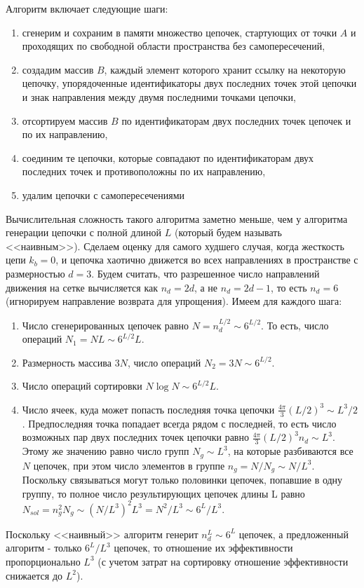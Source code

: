 \documentclass[tikz,a4paper]{scrartcl} %
\begin{document}
Алгоритм включает следующие шаги:
\begin{enumerate}
\item сгенерим и сохраним в памяти множество цепочек, стартующих от точки $A$ и проходящих по свободной области пространства без самопересечений,
\item создадим массив $B$, каждый элемент которого хранит ссылку на некоторую цепочку, упорядоченные идентификаторы двух последних точек этой цепочки и знак направления между двумя последними точками цепочки,
\item отсортируем массив $B$ по идентификаторам двух последних точек цепочек и по их направлению,
\item соединим те цепочки, которые совпадают по идентификаторам двух последних точек и противоположны по их направлению,
\item удалим цепочки с самопересечениями
\end{enumerate}

Вычислительная сложность такого алгоритма заметно меньше, чем у алгоритма генерации цепочки с полной длиной $L$ (который будем называть <<наивным>>). Сделаем оценку для самого худшего случая, когда жесткость цепи $k_b=0$, и цепочка хаотично движется во всех направлениях в пространстве с размерностью $d=3$. Будем считать, что разрешенное число направлений движения на сетке вычисляется как $n_d = 2d$, а не $n_d = 2d-1$, то есть $n_d =6$ (игнорируем направление возврата для упрощения). Имеем для каждого шага: 
\begin{enumerate}
\item Число сгенерированных цепочек равно $N = n_d^{L/2} \sim 6^{L/2}$. То есть, число операций $N_1 = N L \sim 6^{L/2} L$.
\item Размерность массива $3 N$, число операций $N_2 = 3 N \sim 6^{L/2}$.
\item Число операций сортировки $N \log N \sim 6^{L/2} L$.
\item Число ячеек, куда может попасть последняя точка цепочки $\frac{4\pi}{3}(L/2)^3 \sim L^3/2$. Предпоследняя точка попадает всегда рядом с последней, то есть число возможных пар двух последних точек цепочки равно $\frac{4\pi}{3}(L/2)^3 n_d \sim L^3$. Этому же значению равно число групп $N_g \sim L^3$, на которые разбиваются все $N$ цепочек, при этом число элементов в группе $n_g = N/N_g \sim N/ L^3$. Поскольку связываться могут только половинки цепочек, попавшие в одну группу, то полное число результирующих цепочек длины L равно $N_{sol} = n_g^2 N_g \sim (N/L^3)^2 L^3 = N^2 / L^3 \sim 6^L / L^3$.
\end{enumerate}
Поскольку <<наивный>> алгоритм генерит $n_d^L \sim 6^L$ цепочек, а предложенный алгоритм - только $6^L / L^3$ цепочек, то отношение их эффективности пропорционально $L^3$ (с учетом затрат на сортировку отношение эффективности снижается до $L^2$).
\end{document}
